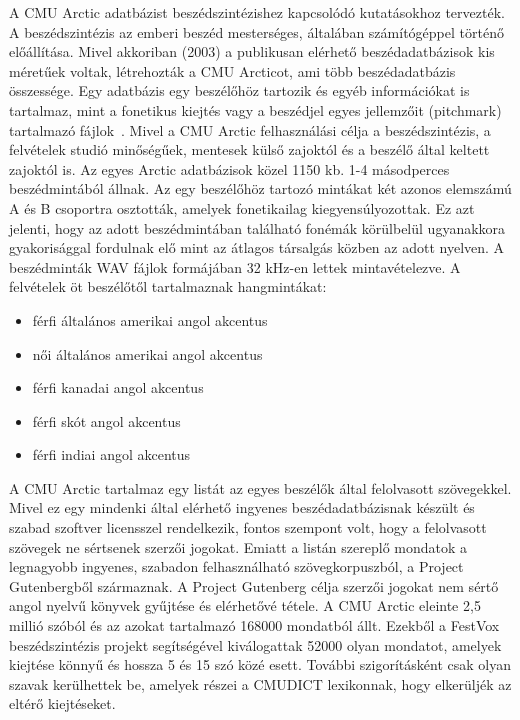 A CMU Arctic adatbázist beszédszintézishez kapcsolódó kutatásokhoz tervezték. A beszédszintézis az emberi beszéd mesterséges, általában számítógéppel történő előállítása. Mivel akkoriban (2003) a publikusan elérhető beszédadatbázisok kis méretűek voltak, létrehozták a CMU Arcticot, ami több beszédadatbázis összessége. Egy adatbázis egy beszélőhöz tartozik és egyéb információkat is tartalmaz, mint a fonetikus kiejtés vagy a beszédjel egyes jellemzőit (pitchmark) tartalmazó fájlok~\cite{cmu_arctic}.
\newline
\newline
Mivel a CMU Arctic felhasználási célja a beszédszintézis, a felvételek studió minőségűek, mentesek külső zajoktól és a beszélő által keltett zajoktól is.
\newline
\newline
Az egyes Arctic adatbázisok közel 1150 kb. 1-4 másodperces beszédmintából állnak. Az egy beszélőhöz tartozó mintákat két azonos elemszámú A és B csoportra osztották, amelyek fonetikailag kiegyensúlyozottak. Ez azt jelenti, hogy az adott beszédmintában található fonémák körülbelül ugyanakkora gyakorisággal fordulnak elő mint az átlagos társalgás közben az adott nyelven.
A beszédminták WAV fájlok formájában 32 kHz-en lettek mintavételezve. A felvételek öt beszélőtől tartalmaznak hangmintákat:
\newline
\begin{itemize}
	\item férfi általános amerikai angol akcentus
	\item női általános amerikai angol akcentus
	\item férfi kanadai angol akcentus
	\item férfi skót angol akcentus
	\item férfi indiai angol akcentus
\end{itemize}
\bigskip
A CMU Arctic tartalmaz egy listát az egyes beszélők által felolvasott szövegekkel.
Mivel ez egy mindenki által elérhető ingyenes beszédadatbázisnak készült és szabad szoftver licensszel rendelkezik, fontos szempont volt, hogy a felolvasott szövegek ne sértsenek szerzői jogokat. Emiatt a listán szereplő mondatok a legnagyobb ingyenes, szabadon felhasználható szövegkorpuszból, a Project Gutenbergből származnak. A Project Gutenberg célja szerzői jogokat nem sértő angol nyelvű könyvek gyűjtése és elérhetővé tétele.
\newline
\newline
A CMU Arctic eleinte 2,5 millió szóból és az azokat tartalmazó 168000 mondatból állt. Ezekből a FestVox beszédszintézis projekt segítségével kiválogattak 52000 olyan mondatot, amelyek kiejtése könnyű és hossza 5 és 15 szó közé esett. További szigorításként csak olyan szavak kerülhettek be, amelyek részei a CMUDICT lexikonnak, hogy elkerüljék az eltérő kiejtéseket.
